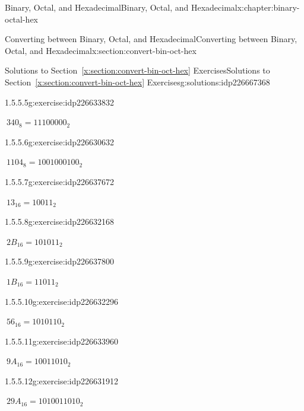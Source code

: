 \documentclass[twoside,10pt,]{book}
\newcommand{\xreffont}{\relax}
\numberwithin{equation}{section}
\begin{document}
\begin{chapterptx}{Binary, Octal, and Hexadecimal}{}{Binary, Octal, and Hexadecimal}{}{}{x:chapter:binary-octal-hex}
\begin{sectionptx}{Converting between Binary, Octal, and Hexadecimal}{}{Converting between Binary, Octal, and Hexadecimal}{}{}{x:section:convert-bin-oct-hex}
\begin{solutions-subsection}{Solutions to Section~{\xreffont\ref*{x:section:convert-bin-oct-hex}} Exercises}{}{Solutions to Section~{\xreffont\ref*{x:section:convert-bin-oct-hex}} Exercises}{}{}{g:solutions:idp226667368}
\begin{exercisegroup}
\begin{divisionsolutioneg}{1.5.5.5}{}{g:exercise:idp226633832}%
\par\smallskip%
\noindent\hypertarget{g:solution:idp226633576-main}{}\(\ 340_8=11100000_2\)\end{divisionsolutioneg}%
\begin{divisionsolutioneg}{1.5.5.6}{}{g:exercise:idp226630632}%
\par\smallskip%
\noindent\hypertarget{g:solution:idp226636392-main}{}\(\ 1104_8=1001000100_2\)\end{divisionsolutioneg}%
\end{exercisegroup}
\par\medskip\noindent
\begin{exercisegroup}
\begin{divisionsolutioneg}{1.5.5.7}{}{g:exercise:idp226637672}%
\par\smallskip%
\noindent\hypertarget{g:solution:idp226631784-main}{}\(\ 13_{16}=10011_2\)\end{divisionsolutioneg}%
\begin{divisionsolutioneg}{1.5.5.8}{}{g:exercise:idp226632168}%
\par\smallskip%
\noindent\hypertarget{g:solution:idp226633448-main}{}\(\ 2B_{16}=101011_2\)\end{divisionsolutioneg}%
\begin{divisionsolutioneg}{1.5.5.9}{}{g:exercise:idp226637800}%
\par\smallskip%
\noindent\hypertarget{g:solution:idp226633704-main}{}\(\ 1B_{16}=11011_2\)\end{divisionsolutioneg}%
\begin{divisionsolutioneg}{1.5.5.10}{}{g:exercise:idp226632296}%
\par\smallskip%
\noindent\hypertarget{g:solution:idp226632552-main}{}\(\ 56_{16}=1010110_2\)\end{divisionsolutioneg}%
\begin{divisionsolutioneg}{1.5.5.11}{}{g:exercise:idp226633960}%
\par\smallskip%
\noindent\hypertarget{g:solution:idp226636264-main}{}\(\ 9A_{16}=10011010_2\)\end{divisionsolutioneg}%
\begin{divisionsolutioneg}{1.5.5.12}{}{g:exercise:idp226631912}%
\par\smallskip%
\noindent\hypertarget{g:solution:idp226638056-main}{}\(\ 29A_{16}=1010011010_2\)\end{divisionsolutioneg}%

\end{exercisegroup}
\end{solutions-subsection}
\end{sectionptx}
\end{chapterptx}
\end{document}

